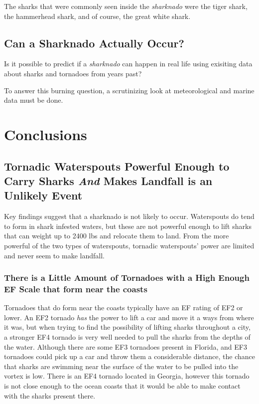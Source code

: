 \documentclass[
  letterpaper,
  DIV=11,
  numbers=noendperiod]{scrreprt}
\begin{document}
The sharks that were commonly seen inside the \emph{sharknado} were the
tiger shark, the hammerhead shark, and of course, the great white shark.

\section{Can a Sharknado Actually
Occur?}\label{can-a-sharknado-actually-occur}

Is it possible to predict if a \emph{sharknado} can happen in real life
using exisiting data about sharks and tornadoes from years past?

To answer this burning question, a scrutinizing look at meteorological
and marine data must be done.

\chapter{Conclusions}\label{conclusions}

\section{\texorpdfstring{Tornadic Waterspouts Powerful Enough to Carry
Sharks \emph{And} Makes Landfall is an Unlikely
Event}{Tornadic Waterspouts Powerful Enough to Carry Sharks And Makes Landfall is an Unlikely Event}}\label{tornadic-waterspouts-powerful-enough-to-carry-sharks-and-makes-landfall-is-an-unlikely-event}

Key findings suggest that a sharknado is not likely to occur.
Waterspouts do tend to form in shark infested waters, but these are not
powerful enough to lift sharks that can weight up to 2400 lbs and
relocate them to land. From the more powerful of the two types of
waterspouts, tornadic waterspouts' power are limited and never seem to
make landfall.

\subsection{There is a Little Amount of Tornadoes with a High Enough EF
Scale that form near the
coasts}\label{there-is-a-little-amount-of-tornadoes-with-a-high-enough-ef-scale-that-form-near-the-coasts}

Tornadoes that do form near the coasts typically have an EF rating of
EF2 or lower. An EF2 tornado \emph{has} the power to lift a car and move
it a ways from where it was, but when trying to find the possibility of
lifting sharks throughout a city, a stronger EF4 tornado is very well
needed to pull the sharks from the depths of the water. Although there
are some EF3 tornadoes present in Florida, and EF3 tornadoes could pick
up a car and throw them a considerable distance, the chance that sharks
are swimming near the surface of the water to be pulled into the vortex
is low. There is an EF4 tornado located in Georgia, however this tornado
is not close enough to the ocean coasts that it would be able to make
contact with the sharks present there.
\end{document}
